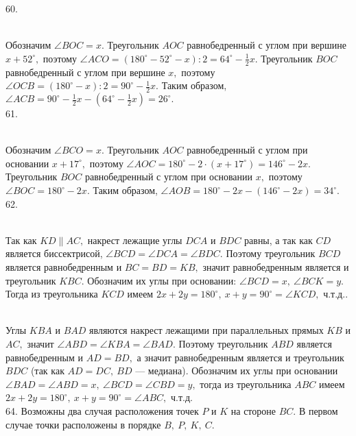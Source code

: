 60. \begin{figure}[ht!]
\end{figure}\\
Обозначим $\angle BOC=x.$ Треугольник $AOC$ равнобедренный с углом при вершине $x+52^\circ,$ поэтому $\angle ACO=(180^\circ-52^\circ-x):2=64^\circ-\frac{1}{2}x.$ Треугольник $BOC$ равнобедренный с углом при вершине $x,$ поэтому $\angle OCB=(180^\circ-x):2=90^\circ-\frac{1}{2}x.$ Таким образом, $\angle ACB=90^\circ-\frac{1}{2}x-(64^\circ-\frac{1}{2}x)=26^\circ.$\\
61. \begin{figure}[ht!]
\end{figure}\\
Обозначим $\angle BCO=x.$ Треугольник $AOC$ равнобедренный с углом при основании $x+17^\circ,$ поэтому $\angle AOC=180^\circ-2\cdot(x+17^\circ)=146^\circ-2x.$ Треугольник $BOC$ равнобедренный с углом при основании $x,$ поэтому $\angle BOC=180^\circ-2x.$ Таким образом, $\angle AOB=180^\circ-2x-(146^\circ-2x)=34^\circ.$\\
62. \begin{figure}[ht!]
\end{figure}\\
Так как $KD\parallel AC,$ накрест лежащие углы $DCA$ и $BDC$ равны, а так как $CD$ является биссектрисой, $\angle BCD=\angle DCA=\angle BDC.$ Поэтому треугольник $BCD$ является равнобедренным и $BC=BD=KB,$ значит равнобедренным является и треугольник $KBC.$ Обозначим их углы при основании: $\angle BCD=x,\ \angle BCK=y.$ Тогда из треугольника $KCD$ имеем $2x+2y=180^\circ,\ x+y=90^\circ=\angle KCD,$ ч.т.д.\newpage{}. \begin{figure}[ht!]
\end{figure}\\
Углы $KBA$ и $BAD$ являются накрест лежащими при параллельных прямых $KB$ и $AC,$ значит $\angle ABD=\angle KBA=\angle BAD.$ Поэтому треугольник $ABD$ является равнобедренным и $AD=BD,$ а значит равнобедренным является и треугольник $BDC$ (так как $AD=DC,\ BD$ --- медиана). Обозначим их углы при основании $\angle BAD=\angle ABD=x,\ \angle BCD=\angle CBD=y,$ тогда из треугольника $ABC$ имеем $2x+2y=180^\circ,\ x+y=90^\circ=\angle ABC,$ ч.т.д.\\
64. Возможны два случая расположения точек $P$ и $K$ на стороне $BC.$ В первом случае точки расположены в порядке $B,\ P,\ K,\ C.$
